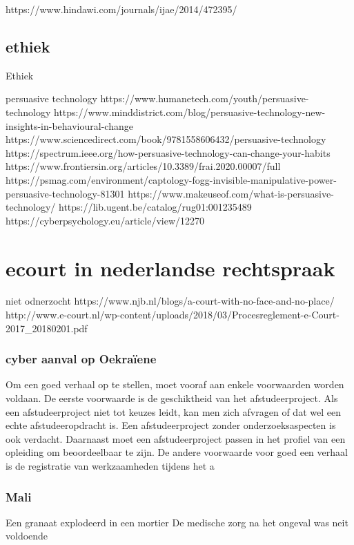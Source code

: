 https://www.hindawi.com/journals/ijae/2014/472395/ 


\subsection{ethiek}


Ethiek 



persuasive technology 
https://www.humanetech.com/youth/persuasive-technology 
https://www.minddistrict.com/blog/persuasive-technology-new-insights-in-behavioural-change 
https://www.sciencedirect.com/book/9781558606432/persuasive-technology 
https://spectrum.ieee.org/how-persuasive-technology-can-change-your-habits 
https://www.frontiersin.org/articles/10.3389/frai.2020.00007/full 
https://psmag.com/environment/captology-fogg-invisible-manipulative-power-persuasive-technology-81301 
https://www.makeuseof.com/what-is-persuasive-technology/ 
https://lib.ugent.be/catalog/rug01:001235489 
https://cyberpsychology.eu/article/view/12270 



\section{ecourt in nederlandse rechtspraak}
niet odnerzocht
https://www.njb.nl/blogs/a-court-with-no-face-and-no-place/ 
http://www.e-court.nl/wp-content/uploads/2018/03/Procesreglement-e-Court-2017_20180201.pdf

\subsubsection{ cyber aanval op Oekraïene }
Om een goed verhaal op te stellen, moet vooraf aan enkele voorwaarden
worden voldaan. De eerste voorwaarde is de geschiktheid van het
afstudeerproject. Als een afstudeerproject niet tot keuzes leidt, kan
men zich afvragen of dat wel een echte afstudeeropdracht is. Een
afstudeerproject zonder onderzoeksaspecten is ook verdacht. Daarnaast
moet een afstudeerproject passen in het profiel van een opleiding om
beoordeelbaar te zijn. De andere voorwaarde voor goed een verhaal is
de registratie van werkzaamheden tijdens het a


\subsubsection{Mali}
Een granaat explodeerd in een mortier
De medische zorg na het ongeval was neit voldoende


